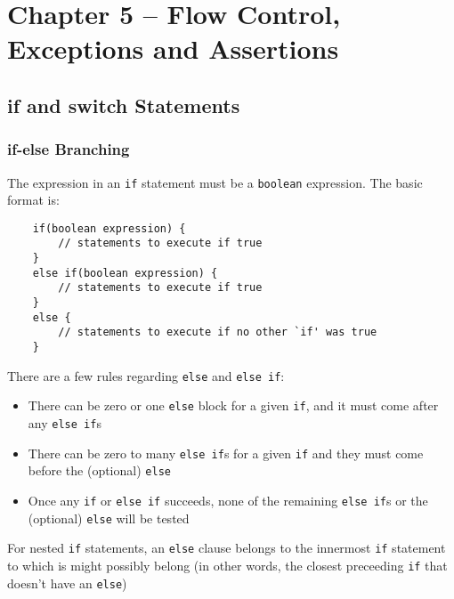 \section{Chapter 5 -- Flow Control, Exceptions and Assertions}
\subsection{if and switch Statements}
\subsubsection{if-else Branching}
The expression in an \verb#if# statement must be a \verb#boolean# expression. 
The basic format is:
\begin{verbatim}
    if(boolean expression) {
        // statements to execute if true
    }
    else if(boolean expression) {
        // statements to execute if true
    }
    else {
        // statements to execute if no other `if' was true
    }
\end{verbatim}
There are a few rules regarding \verb#else# and \verb#else if#:
\begin{itemize}
    \item There can be zero or one \verb#else# block for a given \verb#if#, and 
    it must come after any \verb#else if#s
    \item There can be zero to many \verb#else if#s for a given \verb#if# and 
    they must come before the (optional) \verb#else#
    \item Once any \verb#if# or \verb#else if# succeeds, none of the remaining 
    \verb#else if#s or the (optional) \verb#else# will be tested
\end{itemize}
For nested \verb#if# statements, an \verb#else# clause belongs to the innermost 
\verb#if# statement to which is might possibly belong (in other words, the 
closest preceeding \verb#if# that doesn't have an \verb#else#)

